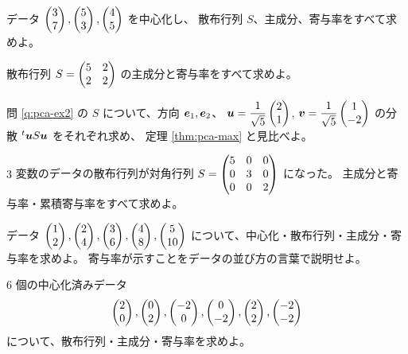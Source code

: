 \begin{mondai}[基本]\label{q:pca-ex1}
データ $\begin{pmatrix}3 \\ 7\end{pmatrix}, \begin{pmatrix}5 \\ 3\end{pmatrix}, \begin{pmatrix}4 \\ 5\end{pmatrix}$ を中心化し、
散布行列 $S$、主成分、寄与率をすべて求めよ。
\end{mondai}

\begin{mondai}[基本]\label{q:pca-ex2}
散布行列 $S = \begin{pmatrix}5 & 2 \\ 2 & 2\end{pmatrix}$ の主成分と寄与率をすべて求めよ。
\end{mondai}

\begin{mondai}[基本]\label{q:pca-ex3}
問 \ref{q:pca-ex2} の $S$ について、方向
$\bm{e}_1, \bm{e}_2$、
$\bm{u} = \dfrac{1}{\sqrt{5}}\begin{pmatrix}2 \\ 1\end{pmatrix}$,
$\bm{v} = \dfrac{1}{\sqrt{5}}\begin{pmatrix}1 \\ -2\end{pmatrix}$
の分散 ${}^t\bm{u}S\bm{u}$ をそれぞれ求め、
定理 \ref{thm:pca-max} と見比べよ。
\end{mondai}

\begin{mondai}[基本]\label{q:pca-ex4}
$3$ 変数のデータの散布行列が対角行列
$S = \begin{pmatrix}5 & 0 & 0 \\ 0 & 3 & 0 \\ 0 & 0 & 2\end{pmatrix}$ になった。
主成分と寄与率・累積寄与率をすべて求めよ。
\end{mondai}

\begin{mondai}[標準]\label{q:pca-ex5}
データ $\begin{pmatrix}1 \\ 2\end{pmatrix}, \begin{pmatrix}2 \\ 4\end{pmatrix}, \begin{pmatrix}3 \\ 6\end{pmatrix}, \begin{pmatrix}4 \\ 8\end{pmatrix},
\begin{pmatrix}5 \\ 10\end{pmatrix}$ について、中心化・散布行列・主成分・寄与率を求めよ。
寄与率が示すことをデータの並び方の言葉で説明せよ。
\end{mondai}

\begin{mondai}[標準]\label{q:pca-ex6}
$6$ 個の中心化済みデータ
\[
\begin{pmatrix}2 \\ 0\end{pmatrix}, \begin{pmatrix}0 \\ 2\end{pmatrix}, \begin{pmatrix}-2 \\ 0\end{pmatrix}, \begin{pmatrix}0 \\ -2\end{pmatrix},
\begin{pmatrix}2 \\ 2\end{pmatrix}, \begin{pmatrix}-2 \\ -2\end{pmatrix}
\]
について、散布行列・主成分・寄与率を求めよ。
\end{mondai}

